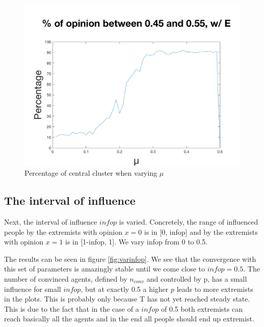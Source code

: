 \documentclass[11pt]{article}
\begin{document}
\begin{figure}[!htb]
\center
  \includegraphics[width=0.7\linewidth]{gen_plot_intervall_2017121721201994207e+01.png}
  \caption{Percentage of central cluster when varying $\mu$}
  \label{fig:uwitextremists}
\end{figure}

\subsection{The interval of influence}
Next, the interval of influence $infop$ is varied. Concretely, the range of influenced people by the extremists with opinion $x=0$ is in [0, infop] and by the extremists with opinion $x=1$ is in [1-infop, 1]. We vary infop from 0 to 0.5. 

The results can be seen in figure \ref{fig:varinfop}. We see that the convergence with this set of parameters is amazingly stable until we come close to $infop = 0.5$. The number of convinced agents, defined by $n_{conv}$ and controlled by p, has a small influence for small $infop$, but at exactly 0.5 a higher $p$ leads to more extremists in the plots. This is probably only because T has not yet reached steady state. This is due to the fact that in the case of a $infop$ of 0.5 both extremists can reach basically all the agents and in the end all people should end up extremist.
\end{document}
